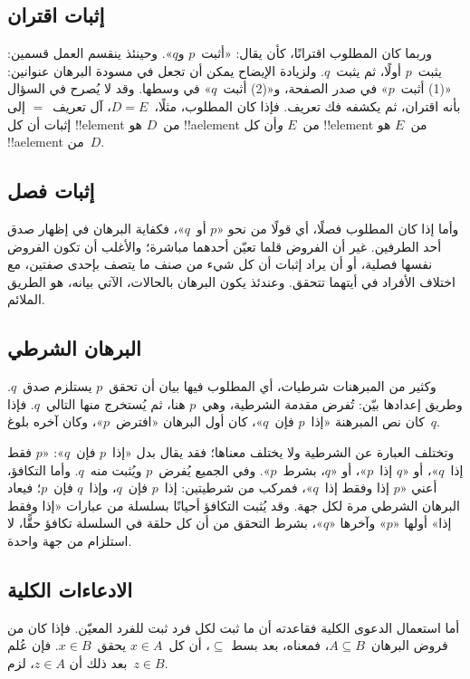 \documentclass[../../../include/open-logic-section]{subfiles}
\begin{document}
\subsection{إثبات اقتران}

وربما كان المطلوب اقترانًا، كأن يقال: «أثبت~$p$ و$q$». وحينئذ ينقسم
العمل قسمين: يثبت~$p$ أولًا، ثم يثبت~$q$. ولزيادة الإيضاح يمكن أن
تجعل في مسودة البرهان عنوانين: «(1) أثبت~$p$» في صدر الصفحة، و«(2)
أثبت~$q$» في وسطها. وقد لا يُصرح في السؤال بأنه اقتران، ثم يكشفه فك
تعريف. فإذا كان المطلوب، مثلًا،~$D = E$، آل تعريف~$=$ إلى إثبات أن
كل !!{element} من~$D$ هو !!a{element} من~$E$ \emph{و}أن كل
!!{element} من~$E$ هو !!a{element} من~$D$.

\subsection{إثبات فصل}

وأما إذا كان المطلوب فصلًا، أي قولًا من نحو «$p$ أو~$q$»، فكفاية
البرهان في إظهار صدق أحد الطرفين. غير أن الفروض قلما تعيّن أحدهما
مباشرة؛ والأغلب أن تكون الفروض نفسها فصلية، أو أن يراد إثبات أن كل
شيء من صنف ما يتصف بإحدى صفتين، مع اختلاف الأفراد في أيتهما تتحقق.
وعندئذ يكون البرهان بالحالات، الآتي بيانه، هو الطريق الملائم.

\subsection{البرهان الشرطي}

وكثير من المبرهنات شرطيات، أي المطلوب فيها بيان أن تحقق~$p$ يستلزم
صدق~$q$. وطريق إعدادها بيّن: تُفرض مقدمة الشرطية، وهي~$p$ هنا، ثم
يُستخرج منها التالي~$q$. فإذا كان نص المبرهنة «إذا~$p$ فإن~$q$»، كان
أول البرهان «افترض~$p$»، وكان آخره بلوغ~$q$.

وتختلف العبارة عن الشرطية ولا يختلف معناها؛ فقد يقال بدل «إذا~$p$
فإن~$q$»: «$p$ فقط إذا~$q$»، أو «$q$ إذا~$p$»، أو «$q$، بشرط~$p$».
وفي الجميع يُفرض~$p$ ويُثبت منه~$q$. وأما التكافؤ، أعني «$p$ إذا
وفقط إذا~$q$»، فمركب من شرطيتين: إذا~$p$ فإن~$q$، وإذا~$q$ فإن~$p$؛
فيعاد البرهان الشرطي مرة لكل جهة. وقد يُثبت التكافؤ أحيانًا بسلسلة
من عبارات «إذا وفقط إذا» أولها «$p$» وآخرها «$q$»، بشرط التحقق من أن
كل حلقة في السلسلة تكافؤ حقًّا، لا استلزام من جهة واحدة.

\subsection{الادعاءات الكلية}

أما استعمال الدعوى الكلية فقاعدته أن ما ثبت لكل فرد ثبت للفرد
المعيّن. فإذا كان من فروض البرهان~$A \subseteq B$، فمعناه، بعد بسط
$\subseteq$، أن كل~$x \in A$ يحقق~$x \in B$. فإن عُلم بعد ذلك أن
$z \in A$، لزم~$z \in B$.
\end{document}
